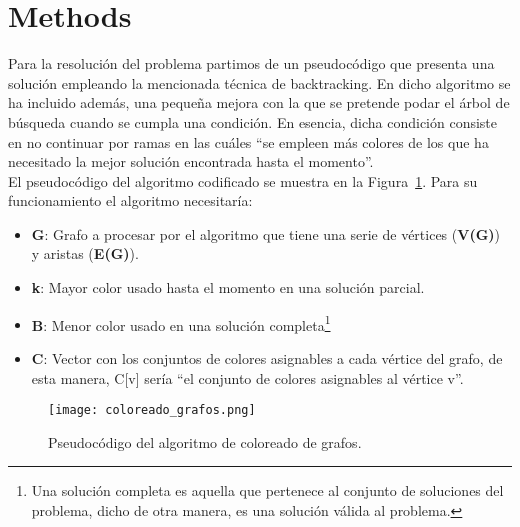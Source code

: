 \documentclass[british,a4paper,11pt,titlepage]{article}
\begin{document}

    \section{Methods}
    \label{sec:methods}
    Para la resolución del problema partimos de un pseudocódigo que presenta una solución empleando la mencionada técnica de backtracking. En dicho algoritmo se ha incluido además, una pequeña mejora con la que se pretende podar el árbol de búsqueda cuando se cumpla una condición. En esencia, dicha condición consiste en no continuar por ramas en las cuáles ``se empleen más colores de los que ha necesitado la mejor solución encontrada hasta el momento''.
    \\
    El pseudocódigo del algoritmo codificado se muestra en la Figura~\ref{fig:pseudo_coloreado}. Para su funcionamiento el algoritmo necesitaría:
    \begin{itemize}
        \item \textbf{G}: Grafo a procesar por el algoritmo que tiene una serie de vértices (\textbf{V(G)}) y aristas (\textbf{E(G)}).
        \item \textbf{k}: Mayor color usado hasta el momento en una solución parcial.
        \item \textbf{B}: Menor color usado en una solución completa\footnote{Una solución completa es aquella que pertenece al conjunto de soluciones del problema, dicho de otra manera, es una solución válida al problema.}
        \item \textbf{C}: Vector con los conjuntos de colores asignables a cada vértice del grafo, de esta manera, C[v] sería ``el conjunto de colores asignables al vértice v''.
    \end{itemize}

    \begin{figure}[p]
        \centering
        \texttt{[image: coloreado\_grafos.png]}%
        \hspace{0.1\linewidth}%
        \caption[]{Pseudocódigo del algoritmo de coloreado de grafos.}
        \label{fig:pseudo_coloreado}
    \end{figure}
\end{document}
